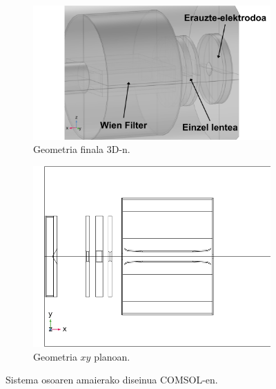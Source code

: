 \documentclass[12pt]{article}
\numberwithin{figure}{section}
\numberwithin{equation}{section}
\begin{document}
\begin{figure}[h]
    \centering
    \begin{subfigure}[b]{0.52\textwidth}
        \centering
        \includegraphics[width=\linewidth]{4 - Diseinua/sistema_osoa_finala.png}
        \caption{Geometria finala 3D-n.}
        \label{fig:sistema_finala_osoa}
    \end{subfigure}
    \hspace{0.02\textwidth}
    \begin{subfigure}[b]{0.4\textwidth}
        \centering
        \includegraphics[width=\linewidth]{4 - Diseinua/sistema_osoa_finala_xy.png}
        \caption{Geometria $xy$ planoan.}
        \label{fig:sistema_finala_xy}
    \end{subfigure}
    \caption{Sistema osoaren amaierako diseinua COMSOL-en.}
    \label{fig:sistema_finala_11}
\end{figure}
\end{document}
